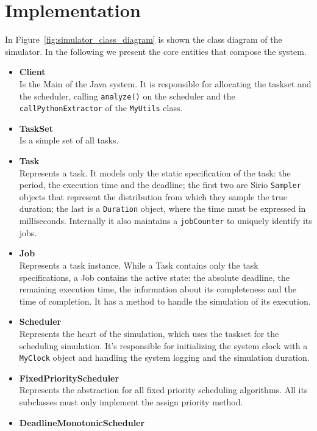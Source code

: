 \section{Implementation}
\label{sec:simulator_implementation}
In Figure~\ref{fig:simulator_class_diagram} is shown the class diagram of the simulator. In the following we present the core entities that compose the system.
\begin{itemize}
    \item \textbf{Client} \\
        Is the Main of the Java system. It is responsible for allocating the taskset and the scheduler, calling \texttt{analyze()} on the scheduler and the \texttt{callPythonExtractor} of the \texttt{MyUtils} class.
    \item \textbf{TaskSet} \\
        Is a simple set of all tasks.
    \item \textbf{Task} \\
        Represents a task. It models only the static specification of the task: the period, the execution time and the deadline; the first two are Sirio \texttt{Sampler} objects that represent the distribution from which they sample the true duration; the last is a \texttt{Duration} object, where the time must be expressed in milliseconds. Internally it also maintains a \texttt{jobCounter} to uniquely identify its jobs.
    \item \textbf{Job} \\
        Represents a task instance. While a Task contains only the task specifications, a Job contains the active state: the absolute deadline, the remaining execution time, the information about its completeness and the time of completion. It has a method to handle the simulation of its execution.
    \item \textbf{Scheduler} \\
        Represents the heart of the simulation, which uses the taskset for the scheduling simulation. It's responsible for initializing the system clock with a \texttt{MyClock} object and handling the system logging and the simulation duration.
    \item \textbf{FixedPriorityScheduler} \\
        Represents the abstraction for all fixed priority scheduling algorithms. All its subclasses must only implement the assign priority method.
    \item \textbf{DeadlineMonotonicScheduler} \\

\end{itemize}
